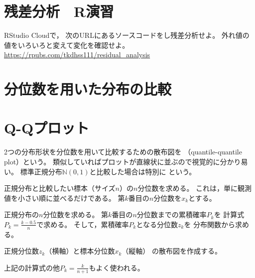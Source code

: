 \section{残差分析　R演習}

\MyFrame{\insertsection}
{
  RStudio Cloudで，
  次のURLにあるソースコードをし残差分析せよ。
  外れ値の値をいろいろと変えて変化を確認せよ。
  \url{https://rpubs.com/tkdhss111/residual_analysis}
}

\section{分位数を用いた分布の比較}

\MyFrame{\insertsection}
{
}

\MyFrame{\insertsection}
{
}

\MyFrame{\insertsection}
{
}

\MyFrame{}
{
}

\section{Q-Qプロット}

\MyFrame{\insertsection}
{
  {
    2つの分布形状を分位数を用いて比較するための散布図を
    （quantile-quantile plot）という。
    類似していればプロットが直線状に並ぶので視覚的に分かり易い。
  }
  標準正規分布$\mathbb{N}(0, 1)$と比較した場合は特別に
  という。
}

\MyFrame{}
{
}

\MyFrame{}
{
}

\MyFrame{}
{
}

\MyFrame{}
{
}

\MyFrame{}
{
}

{
  \MyEnums
  {
    \item 正規分布と比較したい標本（サイズ$n$）の$n$分位数を求める。
          これは，単に観測値を小さい順に並べるだけである。
          第$k$番目の$n$分位数を$x_k$とする。
    \item 正規分布の$n$分位数を求める。
          第$k$番目の$n$分位数までの累積確率$P_k$を
          計算式$P_k=\frac{k-0.5}{n}$で求める。
          そして，累積確率$P_k$となる分位数$z_k$を
          分布関数から求める。
    \item 正規分位数$z_k$（横軸）と標本分位数$x_k$（縦軸）
          の散布図を作成する。
  }
  上記の計算式の他$P_k=\frac{k}{n+1}$もよく使われる。
}

